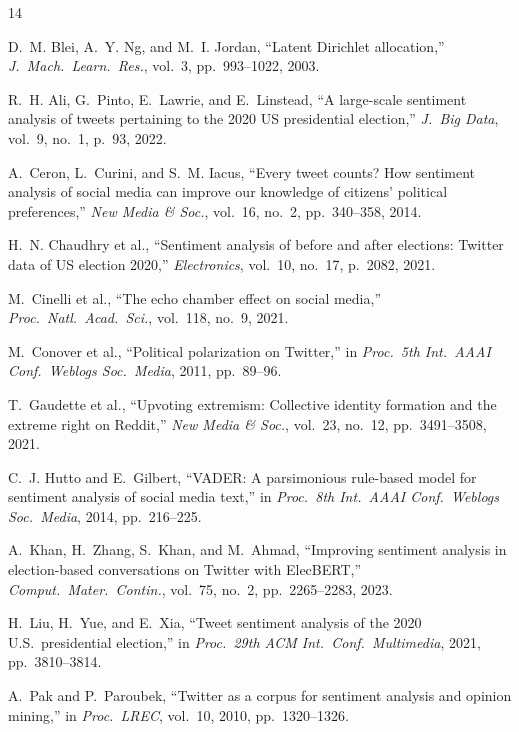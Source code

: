 \documentclass[journal]{IEEEtran}
\begin{document}
\begin{thebibliography}{14}

D.~M. Blei, A.~Y. Ng, and M.~I. Jordan,
``Latent Dirichlet allocation,''
\textit{J.\ Mach.\ Learn.\ Res.}, vol.~3, pp.~993--1022, 2003.

R.~H. Ali, G.~Pinto, E.~Lawrie, and E.~Linstead,
``A large-scale sentiment analysis of tweets pertaining to the 2020 US
presidential election,''
\textit{J.\ Big Data}, vol.~9, no.~1, p.~93, 2022.

A.~Ceron, L.~Curini, and S.~M. Iacus,
``Every tweet counts? How sentiment analysis of social media can improve
our knowledge of citizens' political preferences,''
\textit{New Media \& Soc.}, vol.~16, no.~2, pp.~340--358, 2014.

H.~N. Chaudhry et al.,
``Sentiment analysis of before and after elections: Twitter data of US
election 2020,''
\textit{Electronics}, vol.~10, no.~17, p.~2082, 2021.

M.~Cinelli et al.,
``The echo chamber effect on social media,''
\textit{Proc.\ Natl.\ Acad.\ Sci.}, vol.~118, no.~9, 2021.

M.~Conover et al.,
``Political polarization on Twitter,''
in \textit{Proc.\ 5th Int.\ AAAI Conf.\ Weblogs Soc.\ Media}, 2011,
pp.~89--96.

T.~Gaudette et al.,
``Upvoting extremism: Collective identity formation and the extreme right
on Reddit,''
\textit{New Media \& Soc.}, vol.~23, no.~12, pp.~3491--3508, 2021.

C.~J. Hutto and E.~Gilbert,
``VADER: A parsimonious rule-based model for sentiment analysis of social
media text,''
in \textit{Proc.\ 8th Int.\ AAAI Conf.\ Weblogs Soc.\ Media}, 2014,
pp.~216--225.

A.~Khan, H.~Zhang, S.~Khan, and M.~Ahmad,
``Improving sentiment analysis in election-based conversations on Twitter
with ElecBERT,''
\textit{Comput.\ Mater.\ Contin.}, vol.~75, no.~2, pp.~2265--2283, 2023.

H.~Liu, H.~Yue, and E.~Xia,
``Tweet sentiment analysis of the 2020 U.S.\ presidential election,''
in \textit{Proc.\ 29th ACM Int.\ Conf.\ Multimedia}, 2021,
pp.~3810--3814.

A.~Pak and P.~Paroubek,
``Twitter as a corpus for sentiment analysis and opinion mining,''
in \textit{Proc.\ LREC}, vol.~10, 2010, pp.~1320--1326.


\end{thebibliography}
\end{document}
